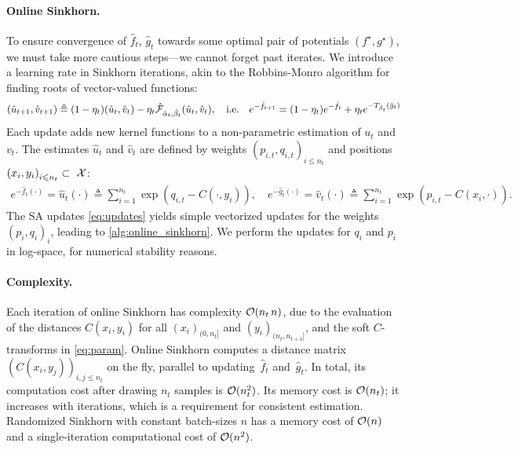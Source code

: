 \paragraph{Online Sinkhorn.}

To ensure convergence of $\hat f_t$, $\hat g_t$ towards some optimal pair of potentials
$(f^\star, g^\star)$, we must take more
cautious steps---we cannot forget past iterates. We introduce a learning
rate in Sinkhorn iterations, akin to the Robbins-Monro algorithm for finding
roots of vector-valued functions:
\begin{equation}\label{eq:updates}
    (\hat u_{t+1}, \hat v_{t+1}) \triangleq (1 - \eta_t) (\hat u_t, \hat v_t) 
    - \eta_t \hat \Ff_{\hat \alpha_t, \hat \beta_t}(\hat u_t, \hat v_t),\quad\text{i.e.}\quad
    e^{-\hat f_{t+1}} = (1 - \eta_t) e^{-\hat f_{t}} + 
    \eta_t e^{-\Ctrans{\hat g_t}{\hat \beta_t}}
\end{equation}
Each update adds new kernel functions to a non-parametric estimation of $
u_t$ and $v_t$. The estimates $\hat u_t$ and $\hat v_t$ are defined by weights ${(p_{i,t},
q_{i,t})}_{i \leq n_t}$ and positions ${(x_i, y_i)}_{i \leq n_t} \subset~\Xx$:
\begin{align}\label{eq:param}
    e^{-\hat f_t(\cdot)} = \hat u_t(\cdot) \triangleq \sum_{i=1}^{n_t} 
    \exp(q_{i,t} - C(\cdot, y_i)),\quad
    e^{-\hat g_t(\cdot)} = \hat v_t(\cdot) \triangleq \sum_{i=1}^{n_t}
    \exp(p_{i,t} - C(x_i, \cdot)).
\end{align}
The SA updates \eqref{eq:updates} yields simple vectorized updates for the weights
${(p_i,q_i)}_i$, leading to \autoref{alg:online_sinkhorn}. We perform
the updates for $q_i$ and $p_i$ in log-space, for numerical stability reasons.

\paragraph{Complexity.}

Each iteration of online Sinkhorn has complexity $\Oo(n_t\,n)$, due to the evaluation of the
distances $C(x_i, y_i)$ for all $(x_i)_{(0, n_t]}$ and $(y_i)_{(n_t, n_{t+1}]}$,
and the soft $C$-transforms in \eqref{eq:param}. Online Sinkhorn computes a
distance matrix $(C(x_i,y_j))_{i,j \leq n_t}$ on the fly, parallel to
updating~$\hat f_t$ and~$\hat g_t$. In total, its computation cost after drawing
$n_t$ samples is $\Oo(n_t^2)$. Its memory cost is $\Oo(n_t)$; it increases with
iterations, which is a requirement for consistent estimation. Randomized
Sinkhorn with constant batch-sizes $n$ has a memory cost of $\Oo(n)$ and a
single-iteration computational cost of $\Oo(n^2)$.

